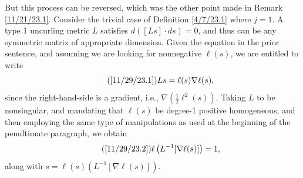 \documentclass{amsart}
\numberwithin{equation}{section}
\theoremstyle{definition}
\numberwithin{theorem}{section}
\begin{document}
But this process can be reversed, which was the other point made in Remark \ref{11/21/23.1}.  Consider the trivial case of Definition \ref{4/7/23.1} where $j=1$.  A type 1 uncurling metric $L$ satisfies $d([Ls]\cdot ds)=0$, and thus can be any symmetric matrix of appropriate dimension.  Given the equation in the prior sentence, and assuming we are looking for nonnegative $\ell(s)$, we are entitled to write \begin{equation}\tag{\ref{11/29/23.1}} Ls = \ell(s)\nabla\ell(s),\end{equation} since the right-hand-side is a gradient, i.e., $\nabla(\frac{1}{2}\ell^2(s))$.  
Taking $L$ to be nonsingular, and mandating that $\ell(s)$ be degree-1 positive homogeneous, and then employing the same type of manipulations as used at the beginning of the penultimate paragraph, we obtain \begin{equation}\tag{\ref{11/29/23.2}}\ell\left(L^{-1}[\nabla\ell(s)]\right) = 1,\end{equation} along with $ s = \ell(s)\left(L^{-1}[\nabla\ell(s)]\right)$.  
\end{document}
